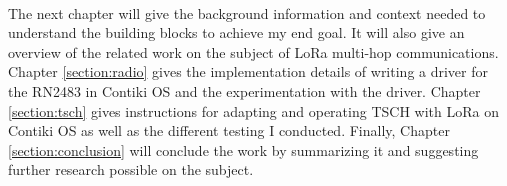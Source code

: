 \paragraph{}

The next chapter will give the background information and context needed to
understand the building blocks to achieve my end goal.
It will also give an overview of the related work on the subject of
LoRa multi-hop communications.
Chapter \ref{section:radio} gives the implementation details of writing a driver for the
RN2483 in Contiki OS and the experimentation with the driver.
Chapter \ref{section:tsch} gives instructions for adapting and operating TSCH with LoRa on
Contiki OS as well as the different testing I conducted.
Finally, Chapter \ref{section:conclusion} will conclude the work by summarizing it and suggesting
further research possible on the subject.
